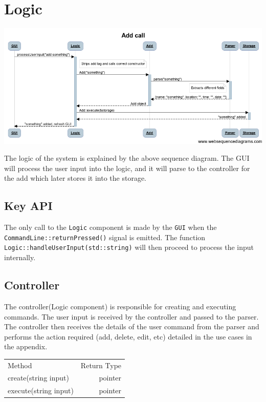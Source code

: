 \documentclass[12pt]{extarticle}
\begin{document}
\section{Logic}

\includegraphics[width=\textwidth]{add_call_diagram}

The logic of the system is explained by the above sequence diagram. The GUI will process the user input into the logic, and it will parse to the controller for the add which later stores it into the storage.

\subsection{Key API}
The only call to the \texttt{Logic} component is made by the \texttt{GUI} when the \texttt{CommandLine::returnPressed()} signal is emitted. The function \texttt{Logic::handleUserInput(std::string)} will then proceed to process the input internally.

\subsection{Controller}

The controller(Logic component) is responsible for creating and executing commands. The user input is received by the controller and passed to the parser. The controller then receives the details of the user command from the parser and performs the action required (add, delete, edit, etc) detailed in the use cases in the appendix.

\begin{center}
\begin{tabular}{|l|r|}
Method                & Return Type \\
create(string input)  & pointer     \\
execute(string input) & pointer    
\end{tabular}
\end{center}
\end{document}
